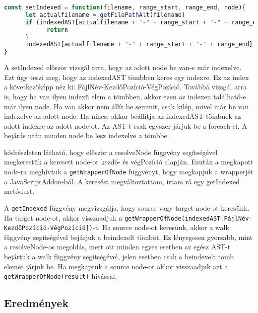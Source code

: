 \begin{lstlisting}[caption={setIndexed metódus}, label={lst:setIndexed_function}, language={JavaScript}]
const setIndexed = function(filename, range_start, range_end, node){
      let actualfilename = getFilePathAlt(filename)
      if (indexedAST[actualfilename + "-" + range_start + "-" + range_end] !== undefined && indexedAST[actualfilename + "-" + range_start + "-" + range_end] !== node){
            return
      }
      indexedAST[actualfilename + "-" + range_start + "-" + range_end] = node
}
\end{lstlisting}

A setIndexed először vizsgál arra, hogy az adott node be van-e már indexelve.
Ezt úgy teszi meg, hogy az indexedAST tömbben keres egy indexre.
Ez az index a következőképp néz ki: FájlNév-KezdőPozíció-VégPozíció.
Továbbá vizsgál arra is, hogy ha van ilyen indexű elem a tömbben, akkor ezen az indexen található-e már ilyen node.
Ha van akkor nem állít be semmit, csak kilép, mivel már be van indexelve az adott node. Ha nincs, akkor beállítja az indexedAST tömbnek az adott indexre az adott node-ot.
Az AST-t csak egyszer járjuk be a foreach-el. A bejárás után minden node be lesz indexelve a tömbbe.

\noindent

 kódrészleten látható, hogy először a resolveNode függvény segítségével megkerestük a keresett node-ot kezdő- és végPozíció alapján.
Ezután a megkapott node-ra meghívtuk a \texttt{getWrapperOfNode} függvényt, hogy megkapjuk a wrapperjét a JavaScriptAddon-ból.
A keresést megváltoztattam, írtam rá egy getIndexed metódust.

\noindent
{}
A \texttt{getIndexed} függvény megvizsgálja, hogy source vagy target node-ot keresünk.
Ha target node-ot, akkor visszaadjuk a \texttt{getWrapperOfNode(indexedAST[FájlNév-KezdőPozíció-VégPozíció])}-t.
Ha source node-ot keresünk, akkor a walk függvény segítségével bejárjuk a beindexelt tömböt.
Ez lényegesen gyorsabb, mint a resolveNode-os megoldás, mert ott minden egyes esetben az egész AST-t bejártuk a walk függvény segítségével, jelen esetben csak a beindexelt tömb elemét járjuk be.
Ha megkaptuk a source node-ot akkor visszaadjuk azt a \texttt{getWrapperOfNode(result)} hívással.

\subsection{Eredmények}

